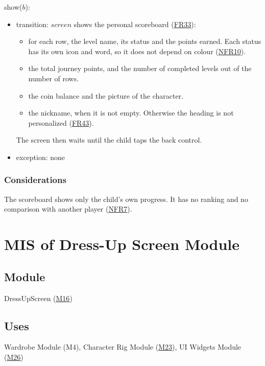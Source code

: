 \documentclass[10pt, titlepage]{article}
\newcommand{\srsurl}{https://team-hindsight.github.io/ophthamology-game/SRS/SRS.pdf}
\newcommand{\srsitemref}[2]{\href{\srsurl\#nameddest=#1}{#2}}
\newcommand{\misref}[2]{\hyperref[mis:#1]{M#2}}
\newcommand{\T}[1]{\mathit{#1}}          %
\begin{document}
\noindent show($b$):
\begin{itemize}
\item transition: $\T{screen}$ shows the personal scoreboard
  (\srsitemref{FR_Scoreboard}{FR33}):
  \begin{itemize}
  \item for each row, the level name, its status and the points earned. Each
    status has its own icon and word, so it does not depend on colour
    (\srsitemref{NFR_Colour}{NFR10}).
  \item the total journey points, and the number of completed levels out of
    the number of rows.
  \item the coin balance and the picture of the character.
  \item the nickname, when it is not empty. Otherwise the heading is not
    personalized (\srsitemref{FR_Nickname}{FR43}).
  \end{itemize}
  The screen then waits until the child taps the back control.
\item exception: none
\end{itemize}

\subsubsection{Considerations}

The scoreboard shows only the child's own progress. It has no ranking and no
comparison with another player (\srsitemref{NFR_NoPressure}{NFR7}).

\newpage
\section{MIS of Dress-Up Screen Module} \label{mis:DressUp}

\subsection{Module}

DressUpScreen (\misref{DressUp}{16})

\subsection{Uses}

Wardrobe Module (M4), Character Rig Module (\misref{Rig}{23}), UI Widgets
Module (\misref{Widgets}{26})
\end{document}
